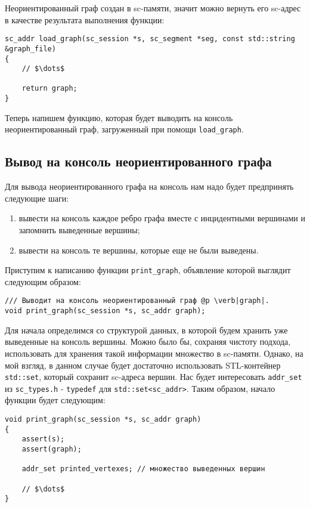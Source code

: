 Неориентированный граф создан в sc-памяти, значит можно вернуть его
sc-адрес в качестве результата выполнения функции:

\begin{lstlisting}[texcl]
sc_addr load_graph(sc_session *s, sc_segment *seg, const std::string &graph_file)
{
    // $\dots$

    return graph;
}
\end{lstlisting}

Теперь напишем функцию, которая будет выводить на консоль
неориентированный граф, загруженный при помощи \lstinline|load_graph|.

\subsection{Вывод на консоль неориентированного графа}
\label{sec:libscprg_print_graph}

Для вывода неориентированного графа на консоль нам надо будет
предпринять следующие шаги:

\begin{enumerate}
\item вывести на консоль каждое ребро графа вместе с инцидентными
  вершинами и запомнить выведенные вершины;
\item вывести на консоль те вершины, которые еще не были выведены.
\end{enumerate}

Приступим к написанию функции \lstinline|print_graph|, объявление
которой выглядит следующим образом:

\begin{lstlisting}[texcl]
/// Выводит на консоль неориентированный граф @p \verb|graph|.
void print_graph(sc_session *s, sc_addr graph);
\end{lstlisting}

Для начала определимся со структурой данных, в которой будем хранить
уже выведенные на консоль вершины. Можно было бы, сохраняя чистоту
подхода, использовать для хранения такой информации множество в
sc-памяти. Однако, на мой взгляд, в данном случае будет достаточно
использовать STL-контейнер \lstinline|std::set|, который сохранит
sc-адреса вершин. Нас будет интересовать \lstinline|addr_set| из
\verb|sc_types.h| - \lstinline|typedef| для
\lstinline|std::set<sc_addr>|. Таким образом, начало функции будет
следующим:

\begin{lstlisting}[texcl]
void print_graph(sc_session *s, sc_addr graph)
{
    assert(s);
    assert(graph);

    addr_set printed_vertexes; // множество выведенных вершин

    // $\dots$
}
\end{lstlisting}

